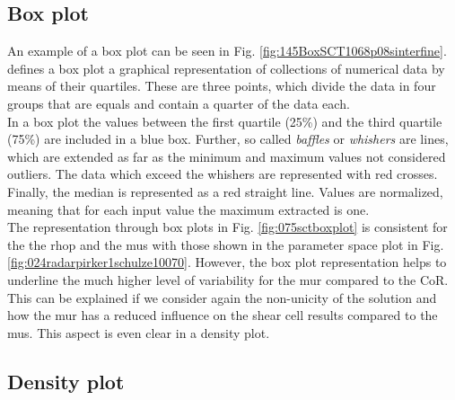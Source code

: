 

\subsection{Box plot}
\label{subsec:boxplot}
  
An example of a box plot can be seen
in Fig. \ref{fig:145BoxSCT1068p08sinterfine}.
\citet{RefWorks:207} defines a box plot a graphical representation of
collections of numerical data by means of their quartiles.
These are three points, which divide the data in four groups that are equals and
contain a quarter of the data each.\\
In a box plot the values between the first quartile (25\%) and the third
quartile (75\%) are included in a blue box.
Further, so called \textit{baffles} or \textit{whishers} are lines, which are
extended as far as the minimum and maximum values not considered outliers.
The data which exceed the whishers are represented with red crosses.
Finally, the median is represented as a red straight line.
Values are normalized, meaning that for each input value the maximum extracted
is one.\\
The representation through box plots in Fig.
\ref{fig:075sctboxplot} is consistent for the the \acs{rhop} and the
\acs{mus} with those shown in the parameter space plot in Fig.
\ref{fig:024radarpirker1schulze10070}.
However, the box plot representation helps to underline the much higher level of
variability for the \acs{mur} compared to the \acs{CoR}.
This can be explained if we consider again the non-unicity of the solution and
how the \acs{mur} has a reduced influence on the shear cell results compared to
the \acs{mus}.
This aspect is even clear in a density plot.



\subsection{Density plot}
\label{subsec:densityplot}

